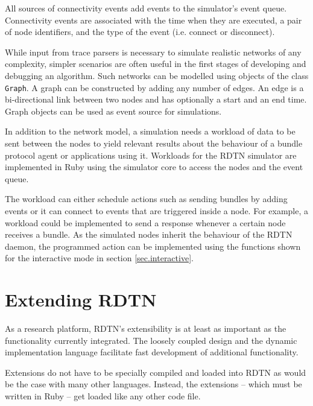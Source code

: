 \documentclass[a4paper]{article}
\begin{document}
All sources of connectivity events add events to the simulator's event queue.
Connectivity events are associated with the time when
they are executed, a pair of node identifiers, and the type of the event (i.e.
connect or disconnect).

While input from trace parsers is necessary to simulate realistic networks of
any complexity, simpler scenarios are often useful in the first stages of
developing and debugging an algorithm. Such networks can be modelled using
objects of the class {\tt Graph}. A graph can be constructed by adding any
number of edges. An edge is a bi-directional link between two nodes and has
optionally a start and an end time. Graph objects can be used as event source
for simulations.

In addition to the network model, a simulation needs a workload of data to be
sent between the nodes to yield relevant results about the behaviour of a bundle
protocol agent or applications using it. Workloads for the RDTN simulator are
implemented in Ruby using the simulator core to access the nodes and the event
queue. 

The workload can either schedule actions such as sending bundles by adding
events or it can connect to events that are triggered inside a node. For
example, a workload could be implemented to send a response whenever a certain
node receives a bundle. As the simulated nodes inherit the behaviour of the RDTN
daemon, the programmed action can be implemented using the functions shown for
the interactive mode in section \ref{sec.interactive}.

\section{Extending RDTN}\label{sec.extending}

As a research platform, RDTN's extensibility is at least as important as the
functionality currently integrated. The loosely coupled design and the dynamic
implementation language facilitate fast development of additional functionality.

Extensions do not have to be specially compiled and loaded into RDTN as would be
the case with many other languages. Instead, the extensions -- which must be
written in Ruby -- get loaded like any other code file.
\end{document}
